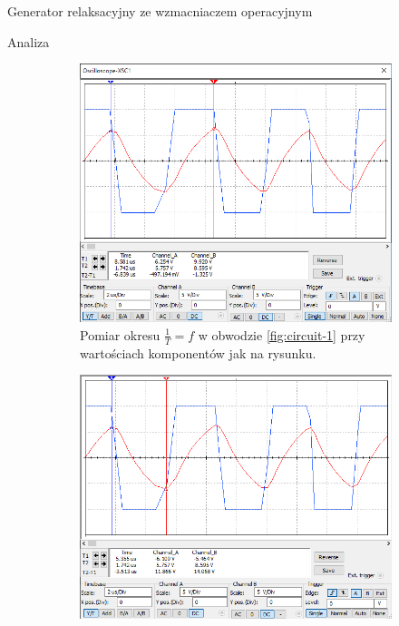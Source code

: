 \documentclass[a4paper]{scrartcl}
\begin{document}
\begin{section}{Generator relaksacyjny ze wzmacniaczem operacyjnym}
\begin{subsection}{Analiza}
				\begin{figure}[!ht]
				\begin{center}
					\begin{subfigure}{.45\textwidth}
						\begin{center}
						\includegraphics[width=\linewidth,scale=2]{03-period}
						\caption{Pomiar okresu $ \frac{1}{T} = f $ w obwodzie \ref{fig:circuit-1} przy wartościach komponentów jak na rysunku.}
						\label{fig:exercise-2-punkt-pracy}
						\end{center}
					\end{subfigure}
					\begin{subfigure}{.45\textwidth}
						\begin{center}
						\includegraphics[width=\linewidth,scale=2]{03-ucminmax}

\end{center}
\end{subfigure}
\end{center}
\end{figure}
\end{subsection}
\end{section}
\end{document}
